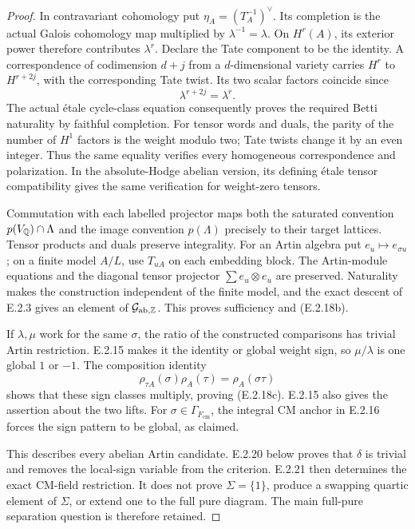 \begin{proof}
In contravariant cohomology put
\(\eta_A=(T_A^{-1})^\vee\). Its completion is the actual
Galois cohomology map multiplied by
\(\lambda^{-1}=\lambda\). On \(H^r(A)\), its exterior power
therefore contributes \(\lambda^r\).
Declare the Tate component to be the identity.
A correspondence of codimension \(d+j\) from a
\(d\)-dimensional variety carries \(H^r\) to \(H^{r+2j}\),
with the corresponding Tate twist. Its two scalar factors
coincide since
\[
 \lambda^{r+2j}=\lambda^r.
\]
The actual étale cycle-class equation consequently proves
the required Betti naturality by faithful completion.
For tensor words and duals, the parity of the number of
\(H^1\) factors is the weight modulo two; Tate twists change
it by an even integer. Thus the same equality verifies
every homogeneous correspondence and polarization.
In the absolute-Hodge abelian version, its defining étale
tensor compatibility gives the same verification for
weight-zero tensors.

Commutation with each labelled projector maps both the
saturated convention \(p(V_\mathbb Q)\cap\Lambda\) and the image
convention \(p(\Lambda)\) precisely to their target lattices.
Tensor products and duals preserve integrality.
For an Artin algebra put \(e_u\mapsto e_{\sigma u}\);
on a finite model \(A/L\), use \(T_{uA}\) on each
embedding block. The Artin-module equations and the
diagonal tensor projector \(\sum e_u\otimes e_u\)
are preserved. Naturality makes the construction
independent of the finite model, and the exact descent
of E.2.3 gives an element of
\(\mathcal G_{\mathrm{ab},\mathbb Z}\).
This proves sufficiency and (E.2.18b).

If \(\lambda,\mu\) work for the same \(\sigma\), the ratio
of the constructed comparisons has trivial Artin
restriction. E.2.15 makes it the identity or global
weight sign, so \(\mu/\lambda\) is one global \(1\)
or \(-1\). The composition identity
\[
 \rho_{\tau A}(\sigma)\rho_A(\tau)=\rho_A(\sigma\tau)
\]
shows that these sign classes multiply, proving
(E.2.18c). E.2.15 also gives the assertion about the
two lifts. For \(\sigma\in\Gamma_{F_{\mathrm{cm}}}\),
the integral CM anchor in E.2.16 forces the sign
pattern to be global, as claimed.

This describes every abelian Artin candidate.
E.2.20 below proves that \(\delta\) is trivial and
removes the local-sign variable from the criterion.
E.2.21 then determines the exact CM-field restriction.
It does not prove \(\Sigma=\{1\}\), produce a swapping
quartic element of \(\Sigma\), or extend one to the
full pure diagram. The main full-pure separation
question is therefore retained.
\end{proof}

